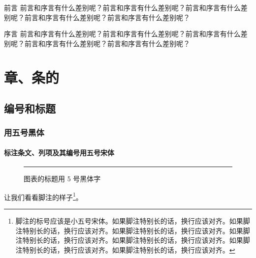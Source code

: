 \documentclass{GB-template}
\begin{document}

\frontmatter
\renewcommand{\thepage}{\Roman{page}}
\maketitlepage
\patchchapter
\tableofcontents\listoffigures\listoftables
\restorechapter
\begin{preamble}{前言}
    前言和序言有什么差别呢？前言和序言有什么差别呢？前言和序言有什么差别呢？前言和序言有什么差别呢？前言和序言有什么差别呢？
\end{preamble}
\begin{preamble}{序言}
    前言和序言有什么差别呢？前言和序言有什么差别呢？前言和序言有什么差别呢？前言和序言有什么差别呢？前言和序言有什么差别呢？
\end{preamble}
\mainmatter
\chapter{章、条的}
\section{编号和标题}
\subsection{用五号黑体}
\subsubsection{标注条文、列项及其编号用五号宋体}
\begin{figure}[htb]
\centering
\rule{4cm}{3cm}
\caption{图表的标题用 5 号黑体字}\label{fig:dummyfigure}
\end{figure}

让我们看看脚注的样子\footnote{脚注的标号应该是小五号宋体。如果脚注特别长的话，换行应该对齐。如果脚注特别长的话，换行应该对齐。如果脚注特别长的话，换行应该对齐。如果脚注特别长的话，换行应该对齐。如果脚注特别长的话，换行应该对齐。如果脚注特别长的话，换行应该对齐。如果脚注特别长的话，换行应该对齐。}。
\appendix
\autoclearpage
{}
\end{document}
